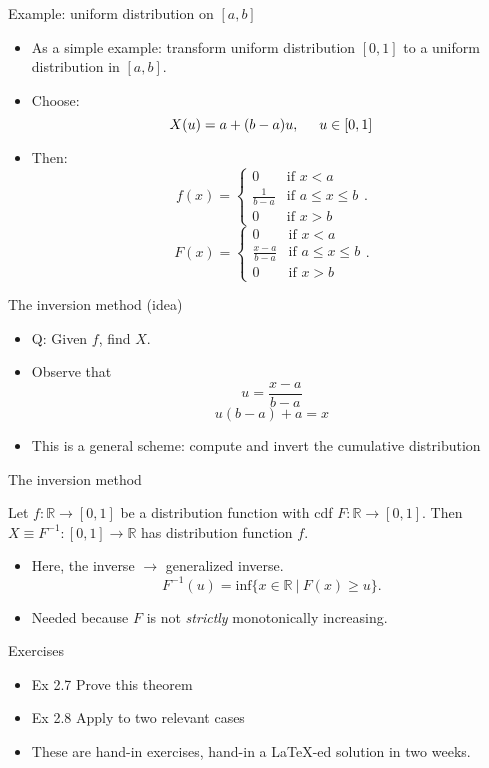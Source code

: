 \documentclass[10pt]{beamer}
\begin{document}
\begin{frame}[label={sec:orgdfe3786}]{Example: uniform distribution on \([a, b]\)}
\begin{itemize}
\item As a simple example: transform uniform distribution \([0, 1]\) to a uniform
distribution in \([a, b]\).
\item Choose:
$$X(u) = a + (b - a) u, \hspace{0.5 cm}u \in [0, 1]$$
\item Then:
$$f(x) = \begin{cases}
  0 & \text{if } x < a\\
  \frac{1}{b - a} & \text{if } a \leq x \leq b\\
  0 & \text{if } x > b
  \end{cases}.$$
$$F(x) = \begin{cases}
  0 & \text{if } x < a\\
  \frac{x - a}{b - a} & \text{if } a \leq x \leq b\\
  0 & \text{if } x > b
  \end{cases}.$$
\end{itemize}
\end{frame}
\begin{frame}[label={sec:org632c33c}]{The inversion method (idea)}
\begin{itemize}
\item \alert{\alert{Q:}} Given \(f\), find \(X\).
\item Observe that
$$u = \frac{x - a}{b - a}$$
$$u (b - a) + a = x$$
\item This is a general scheme: \alert{compute and invert the cumulative distribution}
\end{itemize}
\end{frame}
\begin{frame}[label={sec:org0b3c503}]{The inversion method}
\begin{theorem}
Let $f: \mathbb{R} \to [0, 1]$ be a distribution function with cdf $F: \mathbb{R} \to [0, 1]$.
Then $X \equiv F^{-1}: [0, 1] \to \mathbb{R}$ has distribution function $f$. 
\end{theorem}
\begin{itemize}
\item Here, the inverse \(\rightarrow\) \alert{generalized inverse}.
$$F^{-1}(u) = \text{inf} \{ x \in \mathbb{R}~|~F(x) \geq u \}.$$
\item Needed because \(F\) is not \emph{strictly} monotonically increasing.
\end{itemize}
\end{frame}
\begin{frame}[label={sec:org4cbe30f}]{Exercises}
\begin{itemize}
\item \alert{\alert{Ex 2.7}} Prove this theorem
\item \alert{\alert{Ex 2.8}} Apply to two relevant cases
\item These are hand-in exercises, hand-in a \LaTeX{}-ed solution in two weeks.
\end{itemize}
\end{frame}
\end{document}
